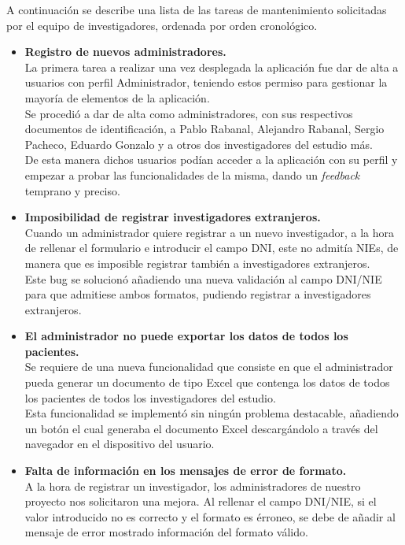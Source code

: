 A continuación se describe una lista de las tareas de mantenimiento solicitadas por el equipo de investigadores, ordenada por orden cronológico. \\
\begin{itemize}
  \item\textbf{Registro de nuevos administradores.} \\
  La primera tarea a realizar una vez desplegada la aplicación fue dar de alta a usuarios con perfil Administrador, teniendo estos permiso para gestionar la mayoría de elementos de la aplicación. \\
  \newline
  Se procedió a dar de alta como administradores, con sus respectivos documentos de identificación, a Pablo Rabanal, Alejandro Rabanal, Sergio Pacheco, Eduardo Gonzalo y a otros dos investigadores del estudio más. \\
  \newline
  De esta manera dichos usuarios podían acceder a la aplicación con su perfil y empezar a probar las funcionalidades de la misma, dando un \textit{feedback} temprano y preciso.
  
  \item\textbf{Imposibilidad de registrar investigadores extranjeros.} \\
  Cuando un administrador quiere registrar a un nuevo investigador, a la hora de rellenar el formulario e introducir el campo DNI, este no admitía NIEs, de manera que es imposible registrar también a investigadores extranjeros. \\
  
  Este bug se solucionó añadiendo una nueva validación al campo DNI/NIE para que admitiese ambos formatos, pudiendo registrar a investigadores extranjeros.
  
  \item\textbf{El administrador no puede exportar los datos de todos los pacientes.} \\
  Se requiere de una nueva funcionalidad que consiste en que el administrador pueda generar un documento de tipo Excel que contenga los datos de todos los pacientes de todos los investigadores del estudio. \\
  
  Esta funcionalidad se implementó sin ningún problema destacable, añadiendo un botón el cual generaba el documento Excel descargándolo a través del navegador en el dispositivo del usuario.
  
   \item\textbf{Falta de información en los mensajes de error de formato.} \\
   A la hora de registrar un investigador, los administradores de nuestro proyecto nos solicitaron una mejora. Al rellenar el campo DNI/NIE, si el valor introducido no es correcto y el formato es érroneo, se debe de añadir al mensaje de error mostrado información del formato válido.
   

\end{itemize}
